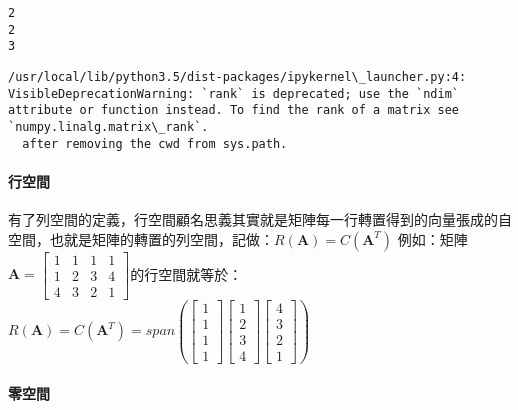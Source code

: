 \documentclass[11pt]{article}
\begin{document}
{    \begin{Verbatim}[commandchars=\\\{\}]
2
2
3

    \end{Verbatim}

    \begin{Verbatim}[commandchars=\\\{\}]
/usr/local/lib/python3.5/dist-packages/ipykernel\_launcher.py:4: VisibleDeprecationWarning: `rank` is deprecated; use the `ndim` attribute or function instead. To find the rank of a matrix see `numpy.linalg.matrix\_rank`.
  after removing the cwd from sys.path.

    \end{Verbatim}

    \hypertarget{ux884cux7a7aux9593}{%
\paragraph{行空間}\label{ux884cux7a7aux9593}}

有了列空間的定義，行空間顧名思義其實就是矩陣每一行轉置得到的向量張成的自空間，也就是矩陣的轉置的列空間，記做：\(R(\mathbf{A}) = C(\mathbf{A}^T)\)
例如：矩陣\(\mathbf{A} = \begin{bmatrix}1 & 1 & 1 & 1 \\ 1 & 2 & 3 & 4 \\4 & 3 & 2 & 1\end{bmatrix}\)的行空間就等於：\(R(\mathbf{A}) = C(\mathbf{A}^T) = span\left(\begin{bmatrix}1 \\ 1 \\ 1 \\ 1\end{bmatrix}\begin{bmatrix}1 \\ 2 \\ 3 \\ 4\end{bmatrix}\begin{bmatrix}4 \\ 3 \\ 2 \\ 1\end{bmatrix}\right)\)

    \hypertarget{ux96f6ux7a7aux9593}{%
\paragraph{零空間}\label{ux96f6ux7a7aux9593}}

}
\end{document}

